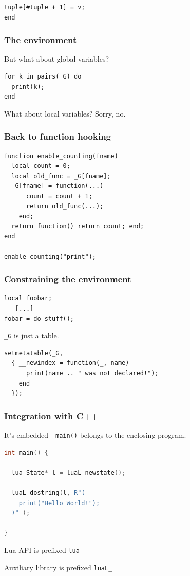 \documentclass{beamer}
\begin{document}
\begin{frame}[fragile]
\begin{lstlisting}
tuple[#tuple + 1] = v;
end
  \end{lstlisting}
\end{frame}


\begin{frame}[fragile]

  \frametitle{The environment}

  But what about global variables?

  \begin{lstlisting}
for k in pairs(_G) do
  print(k);
end
  \end{lstlisting}

  What about local variables?
  Sorry, no.
\end{frame}


\begin{frame}[fragile]

  \frametitle{Back to function hooking}

  \begin{lstlisting}
function enable_counting(fname)
  local count = 0;
  local old_func = _G[fname];
  _G[fname] = function(...)
      count = count + 1;
      return old_func(...);
    end;
  return function() return count; end;
end

enable_counting("print");
  \end{lstlisting}

\end{frame}


\begin{frame}[fragile]

  \frametitle{Constraining the environment}

  \begin{lstlisting}
local foobar;
-- [...]
fobar = do_stuff();
  \end{lstlisting}

  \texttt{\_G} is just a table.

  \begin{lstlisting}
setmetatable(_G,
  { __newindex = function(_, name)
      print(name .. " was not declared!");
    end
  });
  \end{lstlisting}
  
\end{frame}


\begin{frame}[fragile]

  \frametitle{Integration with C++}

  It's embedded - \texttt{main()} belongs to the enclosing program.

  \begin{lstlisting}[language={C++}]
int main() {

  lua_State* l = luaL_newstate();

  luaL_dostring(l, R"(
    print("Hello World!");
  )" );
  
}
  \end{lstlisting}

  Lua API is prefixed \texttt{lua\_}
  
  Auxiliary library is prefixed \texttt{luaL\_}
  
\end{frame}
\end{document}
